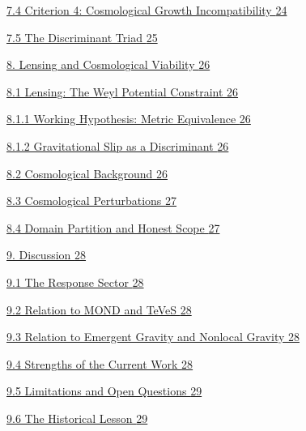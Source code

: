\documentclass[11pt]{article}
\begin{document}
\hyperref[criterion-4-cosmological-growth-incompatibility]{7.4 Criterion 4: Cosmological Growth Incompatibility \hyperref[criterion-4-cosmological-growth-incompatibility]{24}}

\hyperref[the-discriminant-triad]{7.5 The Discriminant Triad \hyperref[the-discriminant-triad]{25}}

\hyperref[lensing-and-cosmological-viability]{8. Lensing and Cosmological Viability \hyperref[lensing-and-cosmological-viability]{26}}

\hyperref[lensing-the-weyl-potential-constraint]{8.1 Lensing: The Weyl Potential Constraint \hyperref[lensing-the-weyl-potential-constraint]{26}}

\hyperref[working-hypothesis-metric-equivalence]{8.1.1 Working Hypothesis: Metric Equivalence \hyperref[working-hypothesis-metric-equivalence]{26}}

\hyperref[gravitational-slip-as-a-discriminant]{8.1.2 Gravitational Slip as a Discriminant \hyperref[gravitational-slip-as-a-discriminant]{26}}

\hyperref[cosmological-background]{8.2 Cosmological Background \hyperref[cosmological-background]{26}}

\hyperref[cosmological-perturbations]{8.3 Cosmological Perturbations \hyperref[cosmological-perturbations]{27}}

\hyperref[domain-partition-and-honest-scope]{8.4 Domain Partition and Honest Scope \hyperref[domain-partition-and-honest-scope]{27}}

\hyperref[discussion]{9. Discussion \hyperref[discussion]{28}}

\hyperref[the-response-sector]{9.1 The Response Sector \hyperref[the-response-sector]{28}}

\hyperref[relation-to-mond-and-teves]{9.2 Relation to MOND and TeVeS \hyperref[relation-to-mond-and-teves]{28}}

\hyperref[relation-to-emergent-gravity-and-nonlocal-gravity]{9.3 Relation to Emergent Gravity and Nonlocal Gravity \hyperref[relation-to-emergent-gravity-and-nonlocal-gravity]{28}}

\hyperref[strengths-of-the-current-work]{9.4 Strengths of the Current Work \hyperref[strengths-of-the-current-work]{28}}

\hyperref[limitations-and-open-questions]{9.5 Limitations and Open Questions \hyperref[limitations-and-open-questions]{29}}

\hyperref[the-historical-lesson]{9.6 The Historical Lesson \hyperref[the-historical-lesson]{29}}
\end{document}
